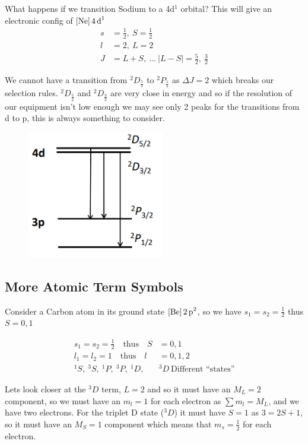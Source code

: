 \documentclass{article}
\begin{document}
    What happens if we transition Sodium to a 4d$^1$ orbital? This will give an electronic config of $\ce{[Ne] 4d^1}$
    \begin{align*}
        s &= \frac{1}{2},\ S=\frac{1}{2}\\
        l &= 2,\ L = 2\\
        J &= L + S,\ ... \ |L-S| = \frac{5}{2},\ \frac{3}{2}
    \end{align*}

    We cannot have a transition from $^2D_\frac{5}{2}$ to $^2P_\frac{1}{2}$ as $\Delta J = 2$ which breaks our selection rules.
    $^2D_\frac{5}{2}$ and $^2D_\frac{3}{2}$ are very close in energy and so if the resolution of our equipment 
    isn't low enough we may see only 2 peaks for the transitions from d to p, this is always something to consider.

    \begin{figure}[h]
        \centering
        \includegraphics[width=6cm]{4d.png}
    \end{figure}

    \subsection{More Atomic Term Symbols}

    Consider a Carbon atom in its ground state $\ce{[Be] 2p^2}$, so we have $s_1 = s_2 = \frac{1}{2}$ thus $S = 0, 1$
    \begin{center}
        \begin{align*}
            s_1 = s_2 = \frac{1}{2} \quad \text{thus}  \quad S &= 0, 1\\
            l_1 = l_2 = 1 \quad \text{thus}  \quad l &= 0, 1, 2\\
            ^1S,\ ^3S,\ ^1P,\ ^3P,\ ^1D,\ &^3D\ \text{Different ``states''}
        \end{align*}
    \end{center}
    Lets look closer at the $^3D$ term, $L=2$ and so it must have an $M_L = 2$ component, so we must have an $m_l = 1$ 
    for each electron as $\sum m_l = M_L$, and we have two electrons. For the triplet D state ($^3D$) it must have 
    $S = 1$ as $3 = 2S + 1$, so it must have an $M_S = 1$ component which means that $m_s = \frac{1}{2}$ for each electron.
\end{document}
